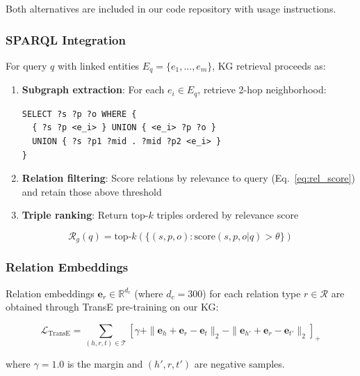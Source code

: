 \documentclass[10pt,twocolumn]{article}
\begin{document}
Both alternatives are included in our code repository with usage instructions.

\subsubsection{SPARQL Integration}
\label{sec:sparql}

For query $q$ with linked entities $E_q = \{e_1, ..., e_m\}$, KG retrieval proceeds as:

\begin{enumerate}
    \item \textbf{Subgraph extraction}: For each $e_i \in E_q$, retrieve 2-hop neighborhood:
    \begin{verbatim}
SELECT ?s ?p ?o WHERE {
  { ?s ?p <e_i> } UNION { <e_i> ?p ?o }
  UNION { ?s ?p1 ?mid . ?mid ?p2 <e_i> }
}
    \end{verbatim}
    
    \item \textbf{Relation filtering}: Score relations by relevance to query (Eq.~\ref{eq:rel_score}) and retain those above threshold
    
    \item \textbf{Triple ranking}: Return top-$k$ triples ordered by relevance score
\end{enumerate}

\begin{equation}
\mathcal{R}_g(q) = \text{top-}k(\{(s,p,o) : \text{score}(s,p,o|q) > \theta\})
\end{equation}


\subsubsection{Relation Embeddings}
\label{sec:relation_embeddings}

Relation embeddings $\mathbf{e}_r \in \mathbb{R}^{d_c}$ (where $d_c=300$) for each relation type $r \in \mathcal{R}$ are obtained through TransE \cite{bordes2013transe} pre-training on our KG:

\begin{equation}
\mathcal{L}_{\text{TransE}} = \sum_{(h,r,t) \in \mathcal{T}} \left[ \gamma + \|\mathbf{e}_h + \mathbf{e}_r - \mathbf{e}_t\|_2 - \|\mathbf{e}_{h'} + \mathbf{e}_r - \mathbf{e}_{t'}\|_2 \right]_+
\end{equation}

where $\gamma=1.0$ is the margin and $(h', r, t')$ are negative samples.
\end{document}

